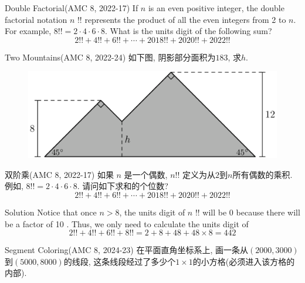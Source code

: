 \documentclass{beamer}
\theoremstyle{definition}
\begin{document}
\begin{frame}{Double Factorial(AMC 8, 2022-17)}
    If $n$ is an even positive integer, the double factorial notation $n$ !! represents the product of all the even integers from 2 to $n$. For example, $8!!=2 \cdot 4 \cdot 6 \cdot 8$. What is the units digit of the following sum?
    $$
        2!!+4!!+6!!+\cdots+2018!!+2020!!+2022!!
    $$
\end{frame}
\begin{frame}{Two Mountains(AMC 8, 2022-24)}
    如下图, 阴影部分面积为$183$, 求$h$.
    \begin{figure}
        \includegraphics[height=0.4\textheight]{two mountains.png}
    \end{figure}
\end{frame}
\begin{frame}{双阶乘(AMC 8, 2022-17)}
    如果 $n$ 是一个偶数, $n!!$ 定义为从$2$到$n$所有偶数的乘积. 例如, $8!!=2 \cdot 4 \cdot 6 \cdot 8$. 请问如下求和的个位数?
    $$
        2!!+4!!+6!!+\cdots+2018!!+2020!!+2022!!
    $$
\end{frame}
\begin{frame}{Solution}
    Notice that once $n>8$, the units digit of $n$ !! will be 0 because there will be a factor of 10 . Thus, we only need to calculate the units digit of
    $$
        2!!+4!!+6!!+8!!=2+8+48+48 \times 8 =442
    $$
\end{frame}
\begin{frame}{Segment Coloring(AMC 8, 2024-23)}
    在平面直角坐标系上, 画一条从$(2000,3000)$到$(5000,8000)$的线段, 这条线段经过了多少个$1\times 1$的小方格(必须进入该方格的内部).
\end{frame}
\end{document}
